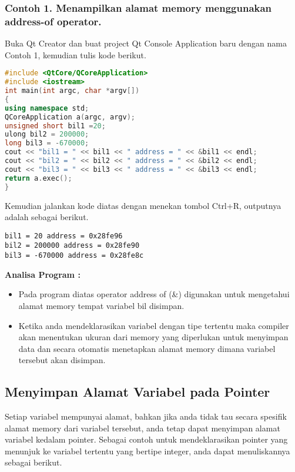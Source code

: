 \subsubsection*{Contoh 1. Menampilkan alamat memory menggunakan address-of operator.}

Buka Qt Creator dan buat project Qt Console Application baru dengan nama
Contoh 1, kemudian tulis kode berikut.

\begin{lstlisting}[language=c++]
#include <QtCore/QCoreApplication>
#include <iostream>
int main(int argc, char *argv[])
{
using namespace std;
QCoreApplication a(argc, argv);
unsigned short bil1 =20;
ulong bil2 = 200000;
long bil3 = -670000;
cout << "bil1 = " << bil1 << " address = " << &bil1 << endl;
cout << "bil2 = " << bil2 << " address = " << &bil2 << endl;
cout << "bil3 = " << bil3 << " address = " << &bil3 << endl;
return a.exec();
}
\end{lstlisting}

Kemudian jalankan kode diatas dengan menekan tombol Ctrl+R, outputnya
adalah sebagai berikut.

\begin{verbatim}
bil1 = 20 address = 0x28fe96 
bil2 = 200000 address = 0x28fe90 
bil3 = -670000 address = 0x28fe8c
\end{verbatim}

\textbf{Analisa Program :}

\begin{itemize}
\tightlist
\item
  Pada program diatas operator address of (\&) digunakan untuk
  mengetahui alamat memory tempat variabel bil disimpan.
\item
  Ketika anda mendeklarasikan variabel dengan tipe tertentu maka
  compiler akan menentukan ukuran dari memory yang diperlukan untuk
  menyimpan data dan secara otomatis menetapkan alamat memory dimana
  variabel tersebut akan disimpan.
\end{itemize}

\subsection{Menyimpan Alamat Variabel pada
Pointer}\label{menyimpan-alamat-variabel-pada-pointer}

Setiap variabel mempunyai alamat, bahkan jika anda tidak tau secara
spesifik alamat memory dari variabel tersebut, anda tetap dapat
menyimpan alamat variabel kedalam pointer. Sebagai contoh untuk
mendeklarasikan pointer yang menunjuk ke variabel tertentu yang bertipe
integer, anda dapat menuliskannya sebagai berikut.

